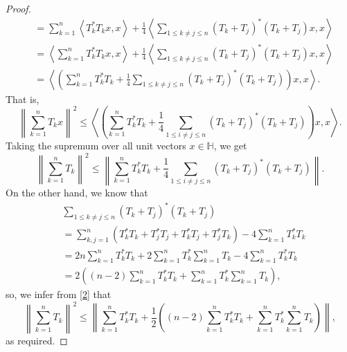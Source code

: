 \documentclass[12pt,twoside,reqno]{amsart}
\numberwithin{equation}{section}
\begin{document}
\begin{proof}
\[\begin{aligned}
 & =\sum\limits_{k=1}^{n}{\left\langle T_{k}^{*}{{T}_{k}}x,x \right\rangle }+\frac{1}{4}\left\langle \sum\limits_{1\le k\ne j\le n}{{{\left( {{T}_{k}}+{{T}_{j}} \right)}^{*}}\left( {{T}_{k}}+{{T}_{j}} \right)}x,x \right\rangle  \\ 
 & =\left\langle \sum\limits_{k=1}^{n}{T_{k}^{*}{{T}_{k}}}x,x \right\rangle +\frac{1}{4}\left\langle \sum\limits_{1\le k\ne j\le n}{{{\left( {{T}_{k}}+{{T}_{j}} \right)}^{*}}\left( {{T}_{k}}+{{T}_{j}} \right)}x,x \right\rangle  \\ 
 & =\left\langle \left( \sum\limits_{k=1}^{n}{T_{k}^{*}{{T}_{k}}}+\frac{1}{4}\sum\limits_{1\le k\ne j\le n}{{{\left( {{T}_{k}}+{{T}_{j}} \right)}^{*}}\left( {{T}_{k}}+{{T}_{j}} \right)} \right)x,x \right\rangle  .
\end{aligned}\]
That is,
\begin{equation}\label{6}
{{\left\| \sum\limits_{k=1}^{n}{{{T}_{k}}}x \right\|}^{2}}\le \left\langle \left( \sum\limits_{k=1}^{n}{T_{k}^{*}{{T}_{k}}}+\frac{1}{4}\sum\limits_{1\le i\ne j\le n}{{{\left( {{T}_{k}}+{{T}_{j}} \right)}^{*}}\left( {{T}_{k}}+{{T}_{j}} \right)} \right)x,x \right\rangle .
\end{equation}
Taking the supremum over all unit vectors $x\in \mathbb H$, we get
\begin{equation}\label{2}
{{\left\| \sum\limits_{k=1}^{n}{{{T}_{k}}} \right\|}^{2}}\le \left\| \sum\limits_{k=1}^{n}{T_{k}^{*}{{T}_{k}}}+\frac{1}{4}\sum\limits_{1\le i\ne j\le n}{{{\left( {{T}_{k}}+{{T}_{j}} \right)}^{*}}\left( {{T}_{k}}+{{T}_{j}} \right)} \right\|.
\end{equation}
On the other hand, we know that
\begin{equation}\label{7}
\begin{aligned}
  & \sum\limits_{1\le k\ne j\le n}{{{\left( {{T}_{k}}+{{T}_{j}} \right)}^{*}}\left( {{T}_{k}}+{{T}_{j}} \right)} \\ 
 & =\sum\limits_{k,j=1}^{n}{\left( T_{k}^{*}{{T}_{k}}+T_{j}^{*}{{T}_{j}}+T_{k}^{*}{{T}_{j}}+T_{j}^{*}{{T}_{k}} \right)}-4\sum\limits_{k=1}^{n}{T_{k}^{*}{{T}_{k}}} \\ 
 & =2n\sum\limits_{k=1}^{n}{T_{k}^{*}{{T}_{k}}}+2\sum\limits_{k=1}^{n}{T_{k}^{*}}\sum\limits_{k=1}^{n}{{{T}_{k}}}-4\sum\limits_{k=1}^{n}{T_{k}^{*}{{T}_{k}}} \\ 
 & =2\left( \left( n-2 \right)\sum\limits_{k=1}^{n}{T_{k}^{*}{{T}_{k}}}+\sum\limits_{k=1}^{n}{T_{k}^{*}}\sum\limits_{k=1}^{n}{{{T}_{k}}} \right),
\end{aligned}
\end{equation}
so, we infer from \eqref{2} that
	\[{{\left\| \sum\limits_{k=1}^{n}{{{T}_{k}}} \right\|}^{2}}\le \left\| \sum\limits_{k=1}^{n}{T_{k}^{*}{{T}_{k}}}+\frac{1}{2}\left( \left( n-2 \right)\sum\limits_{k=1}^{n}{T_{k}^{*}{{T}_{k}}}+\sum\limits_{k=1}^{n}{T_{k}^{*}}\sum\limits_{k=1}^{n}{{{T}_{k}}} \right) \right\|,\]
as required.
\end{proof}
\end{document}
